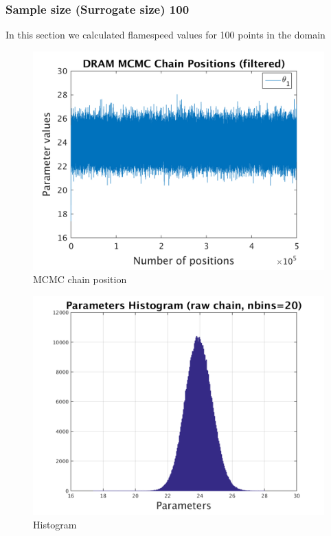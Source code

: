 \subsubsection{Sample size (Surrogate size) 100 }


In this section we calculated flamespeed values for 100 points in the domain 
\begin{figure}[H]
  
  \centering
   \includegraphics[scale=0.75]{100_results/outputData_100/simple_ip_chain_pos_filt}
   \caption{MCMC chain position }
\end{figure}
%
%
\begin{figure}[H]
  
  \centering
   \includegraphics[scale=0.75]{100_results/outputData_100/simple_ip_hist_raw}
   \caption{Histogram}
\end{figure}
